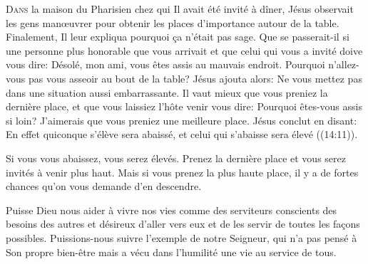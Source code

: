 



\lettrine{D}{ans} la maison du Pharisien chez qui Il avait été invité à dîner,
 Jésus observait les gens man\oe{}uvrer pour obtenir les places
 d'importance autour de la table. Finalement, Il leur expliqua pourquoi
 \c{c}a n'était pas sage.
 \Og Que se passerait-il si une personne plus honorable que vous arrivait
 et que celui qui vous a invité doive vous dire: 
 \Og Désolé, mon ami, vous êtes assis au mauvais endroit.
 Pourquoi n'allez-vous pas vous asseoir au bout de la table? \Fg{}
 Jésus ajouta alors: 
 \Og Ne vous mettez pas dans une situation aussi embarrassante.
 Il vaut mieux que vous preniez la dernière place, et que vous laissiez
 l'hôte venir vous dire: 
 \Og Pourquoi êtes-vous assis si loin?
 J'aimerais que vous preniez une meilleure place. \Fg{}
 Jésus conclut en disant:
 \Og En effet quiconque s'élève sera abaissé,
 et celui qui s'abaisse sera élevé \Fg{} ((14:11)).


Si vous vous abaissez, vous serez élevés.
 Prenez la dernière place et vous serez invités à venir plus haut.
 Mais si vous prenez la plus haute place,
 il y a de fortes chances qu'on vous demande d'en descendre.

Puisse Dieu nous aider à vivre nos vies comme des serviteurs
 \ocadr conscients des besoins des autres et désireux d'aller vers eux
 et de les servir de toutes les fa\c{c}ons possibles.
 Puissions-nous suivre l'exemple de notre Seigneur,
 qui n'a pas pensé à Son propre bien-être mais a vécu
 dans l'humilité une vie au service de tous.

\dvrule



